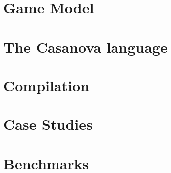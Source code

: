 \documentclass{article}
\begin{document}
\section{Game Model}
\label{sec:game_model}
 

\section{The Casanova language}
\label{sec:casanova}


\section{Compilation}
\label{sec:compilation}


\section{Case Studies}
\label{sec:case_study}


\section{Benchmarks}
\label{sec:benchmarks}



 

\cite{*}
\end{document}
